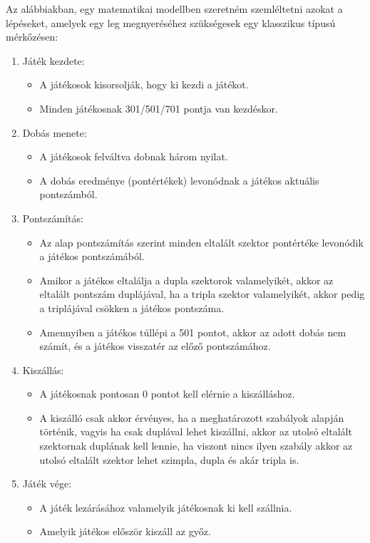 Az alábbiakban, egy matematikai modellben szeretném szemléltetni azokat a lépéseket, amelyek egy leg megnyeréséhez szükségesek egy klasszikus típusú mérkőzésen:
\begin{enumerate}
\item Játék kezdete:
\begin{itemize}
\item A játékosok kisorsolják, hogy ki kezdi a játékot.
\item Minden játékosnak 301/501/701 pontja van kezdéskor.
\end{itemize}
\item Dobás menete:
\begin{itemize}
\item A játékosok felváltva dobnak három nyilat.
\item A dobás eredménye (pontértékek) levonódnak a játékos aktuális pontszámból.
\end{itemize}
\item Pontszámítás:
\begin{itemize}
\item Az alap pontszámítás szerint minden eltalált szektor pontértéke levonódik a játékos pontszámából.
\item Amikor a játékos eltalálja a dupla szektorok valamelyikét, akkor az eltalált pontszám duplájával, ha a tripla szektor valamelyikét, akkor pedig a triplájával csökken a játékos pontszáma.
\item Amennyiben a játékos túllépi a 501 pontot, akkor az adott dobás nem számít, és a játékos visszatér az előző pontszámához.
\end{itemize}
\item Kiszállás:
\begin{itemize}
\item A játékosnak pontosan 0 pontot kell elérnie a kiszálláshoz.
\item A kiszálló csak akkor érvényes, ha a meghatározott szabályok alapján történik, vagyis ha csak duplával lehet kiszállni, akkor az utolsó eltalált szektornak duplának kell lennie, ha viszont nincs ilyen szabály akkor az utolsó eltalált szektor lehet szimpla, dupla és akár tripla is.
\end{itemize}
\item Játék vége:
\begin{itemize}
\item A játék lezárásához valamelyik játékosnak ki kell szállnia.
\item Amelyik játékos először kiszáll az győz.
\end{itemize}
\end{enumerate}
